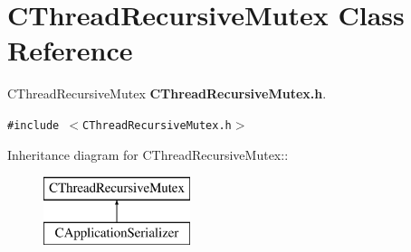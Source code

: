 \section{CThread\-Recursive\-Mutex  Class Reference}
\label{classCThreadRecursiveMutex}
CThread\-Recursive\-Mutex {\bf CThread\-Recursive\-Mutex.h}. 


{\tt \#include $<$CThread\-Recursive\-Mutex.h$>$}

Inheritance diagram for CThread\-Recursive\-Mutex::\begin{figure}[H]
\begin{center}
\leavevmode
\includegraphics[height=2cm]{classCThreadRecursiveMutex}
\end{center}
\end{figure}
